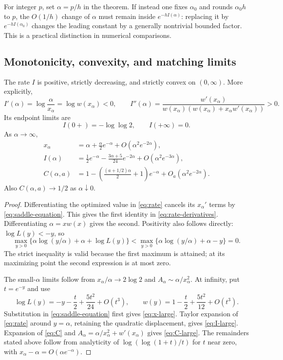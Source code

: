 \begin{remark}
For integer $p$, set $\alpha=p/h$ in the theorem. If instead one fixes
$\alpha_0$ and rounds $\alpha_0h$ to $p$, the $O(1/h)$ change of
$\alpha$ must remain inside $e^{-hI(\alpha)}$: replacing it by
$e^{-hI(\alpha_0)}$ changes the leading constant by a generally
nontrivial bounded factor. This is a practical distinction in numerical
comparisons.
\end{remark}

\subsection{Monotonicity, convexity, and matching limits}

\begin{proposition}\label{prop:rate-properties}
The rate $I$ is positive, strictly decreasing, and strictly convex on
$(0,\infty)$. More explicitly,
\begin{equation}\label{eq:rate-derivatives}
 I'(\alpha)=\log\frac{\alpha}{x_\alpha}=\log w(x_\alpha)<0,
 \qquad
 I''(\alpha)=\frac{w'(x_\alpha)}
 {w(x_\alpha)(w(x_\alpha)+x_\alpha w'(x_\alpha))}>0.
\end{equation}
Its endpoint limits are
\[
 I(0+)=-\log\log2,\qquad I(+\infty)=0.
\]
As $\alpha\to\infty$,
\begin{align}
 x_\alpha&=\alpha+\frac{\alpha}{2}e^{-\alpha}
             +O(\alpha^2e^{-2\alpha}),\label{eq:x-large}\\
 I(\alpha)&=\frac12e^{-\alpha}
      -\frac{3\alpha+5}{24}e^{-2\alpha}
      +O(\alpha^2e^{-3\alpha}),\label{eq:I-large}\\
 C(\alpha,a)&=1-
 \left(\frac{(a+1/2)\alpha}{2}+1\right)e^{-\alpha}
 +O_a(\alpha^2e^{-2\alpha}).\label{eq:C-large}
\end{align}
Also $C(\alpha,a)\to1/2$ as $\alpha\downarrow0$.
\end{proposition}
\begin{proof}
Differentiating the optimized value in \eqref{eq:rate} cancels its
$x_\alpha'$ terms by \eqref{eq:saddle-equation}. This gives the first
identity in \eqref{eq:rate-derivatives}. Differentiating
$\alpha=xw(x)$ gives the second. Positivity also follows directly:
$\log L(y)<-y$, so
\[
 \max_{y>0}\{\alpha\log(y/\alpha)+\alpha+\log L(y)\}
 <\max_{y>0}\{\alpha\log(y/\alpha)+\alpha-y\}=0.
\]
The strict inequality is valid because the first maximum is attained;
at its maximizing point the second expression is at most zero.

The small-$\alpha$ limits follow from
$x_\alpha/\alpha\to2\log2$ and
$A_\alpha\sim\alpha/x_\alpha^2$. At infinity, put $t=e^{-y}$ and use
\[
 \log L(y)=-y-\frac t2+\frac{5t^2}{24}+O(t^3),
 \qquad
 w(y)=1-\frac t2+\frac{5t^2}{12}+O(t^3).
\]
Substitution in \eqref{eq:saddle-equation} first gives
\eqref{eq:x-large}. Taylor expansion of \eqref{eq:rate} around
$y=\alpha$, retaining the quadratic displacement, gives
\eqref{eq:I-large}. Expansion of \eqref{eq:C} and
$A_\alpha=\alpha/x_\alpha^2+w'(x_\alpha)$ gives
\eqref{eq:C-large}. The remainders stated above follow from analyticity
of $\log(\log(1+t)/t)$ for $t$ near zero, with
$x_\alpha-\alpha=O(\alpha e^{-\alpha})$.
\end{proof}

